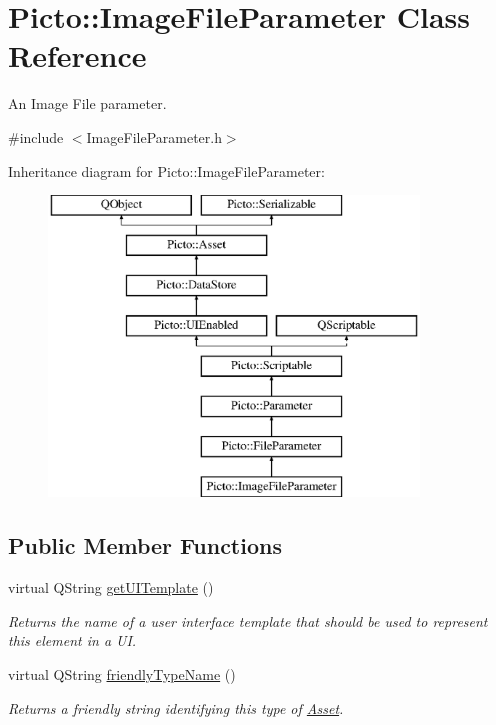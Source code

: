 \hypertarget{class_picto_1_1_image_file_parameter}{\section{Picto\-:\-:Image\-File\-Parameter Class Reference}
\label{class_picto_1_1_image_file_parameter}
}


An Image File parameter.  




{\ttfamily \#include $<$Image\-File\-Parameter.\-h$>$}

Inheritance diagram for Picto\-:\-:Image\-File\-Parameter\-:\begin{figure}[H]
\begin{center}
\leavevmode
\includegraphics[height=8.000000cm]{class_picto_1_1_image_file_parameter}
\end{center}
\end{figure}
\subsection*{Public Member Functions}
\begin{DoxyCompactItemize}
\item 
\hypertarget{class_picto_1_1_image_file_parameter_af149a93be56fc3b8a6a2d44b1414d24d}{virtual Q\-String \hyperlink{class_picto_1_1_image_file_parameter_af149a93be56fc3b8a6a2d44b1414d24d}{get\-U\-I\-Template} ()}\label{class_picto_1_1_image_file_parameter_af149a93be56fc3b8a6a2d44b1414d24d}

\begin{DoxyCompactList}\small\item\em Returns the name of a user interface template that should be used to represent this element in a U\-I. \end{DoxyCompactList}\item 
virtual Q\-String \hyperlink{class_picto_1_1_image_file_parameter_aad67d9dd6c261f85f4b7be6132c19736}{friendly\-Type\-Name} ()
\begin{DoxyCompactList}\small\item\em Returns a friendly string identifying this type of \hyperlink{class_picto_1_1_asset}{Asset}. \end{DoxyCompactList}\end{DoxyCompactItemize}
